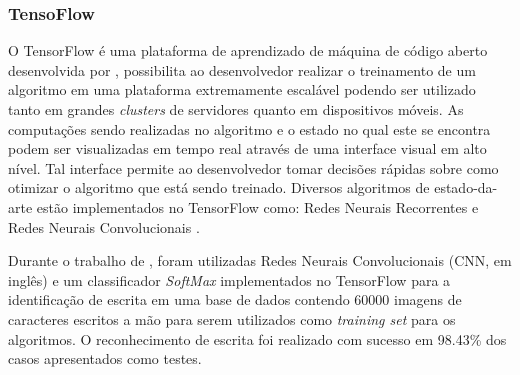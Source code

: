 
\subsubsection{TensoFlow}

O TensorFlow é uma plataforma de aprendizado de máquina de código aberto desenvolvida por , possibilita ao desenvolvedor realizar o treinamento de um algoritmo em uma plataforma extremamente escalável podendo ser utilizado tanto em grandes \textit{clusters} de servidores quanto em dispositivos móveis. As computações sendo realizadas no algoritmo e o estado no qual este se encontra podem ser visualizadas em tempo real através de uma interface visual em alto nível. Tal interface permite ao desenvolvedor tomar decisões rápidas sobre como otimizar o algoritmo que está sendo treinado. Diversos algoritmos de estado-da-arte estão implementados no TensorFlow como: Redes Neurais Recorrentes \cite{tensorflow_rec} e Redes Neurais Convolucionais \cite{tensorflow_cnn}.


Durante o trabalho de , foram utilizadas Redes Neurais Convolucionais (CNN, em inglês) e um classificador \textit{SoftMax} implementados no TensorFlow para a identificação de escrita em uma base de dados contendo 60000 imagens de caracteres escritos a mão para serem utilizados como \textit{training set} para os algoritmos. O reconhecimento de escrita foi realizado com sucesso em 98.43\% dos casos apresentados como testes.


